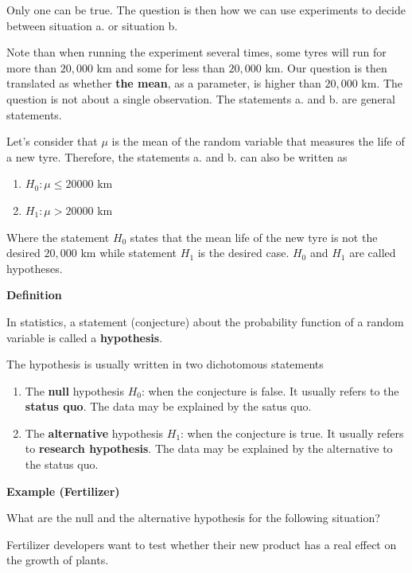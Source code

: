 \documentclass[
]{book}
\providecommand{\tightlist}{%
  \setlength{\itemsep}{0pt}\setlength{\parskip}{0pt}}
\begin{document}
Only one can be true. The question is then how we can use experiments to decide between situation a. or situation b.

Note than when running the experiment several times, some tyres will run for more than \(20,000\) km and some for less than \(20,000\) km. Our question is then translated as whether \textbf{the mean}, as a parameter, is higher than \(20,000\) km. The question is not about a single observation. The statements a. and b. are general statements.

Let's consider that \(\mu\) is the mean of the random variable that measures the life of a new tyre. Therefore, the statements a. and b. can also be written as

\begin{enumerate}
\def\labelenumi{\alph{enumi}.}
\tightlist
\item
  \(H_0: \mu \leq 20000\) km
\item
  \(H_1: \mu > 20000\) km
\end{enumerate}

Where the statement \(H_0\) states that the mean life of the new tyre is not the desired \(20,000\) km while statement \(H_1\) is the desired case. \(H_0\) and \(H_1\) are called hypotheses.

\textbf{Definition}

In statistics, a statement (conjecture) about the probability function of a random variable is called a \textbf{hypothesis}.

The hypothesis is usually written in two dichotomous statements

\begin{enumerate}
\def\labelenumi{\alph{enumi}.}
\item
  The \textbf{null} hypothesis \(H_0\): when the conjecture is false. It usually refers to the \textbf{status quo}. The data may be explained by the satus quo.
\item
  The \textbf{alternative} hypothesis \(H_1\): when the conjecture is true. It usually refers to \textbf{research hypothesis}. The data may be explained by the alternative to the status quo.
\end{enumerate}

\textbf{Example (Fertilizer)}

What are the null and the alternative hypothesis for the following situation?

Fertilizer developers want to test whether their new product has a real effect on the growth of plants.
\end{document}
